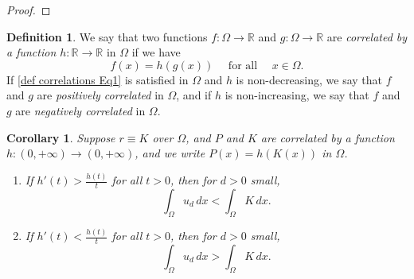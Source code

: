 \documentclass[11pt]{article}
\newcommand{\R}{\mathbb{R}}
\newcommand{\parentheses}[1]{\left(#1\right)}
\newtheorem{corollary}[statement]{Corollary}
\theoremstyle{definition}
\newtheorem{definition}[statement]{Definition}
\theoremstyle{remark}
\newtheorem{remark}[statement]{Remark}
\begin{document}
\begin{proof}
\end{proof}



\begin{definition}
    We say that two functions $f:\Omega\to\R$ and $g:\Omega\to\R$ are {\em correlated by a function $h:\R\to\R$} in $\Omega$ if we have
    \begin{equation}\label{def correlations Eq1}
        f(x)=h(g(x)) \mbox{ ~~ for  all ~~ } x\in\Omega.
    \end{equation}
    If \eqref{def correlations Eq1} is satisfied in $\Omega$ and $h$ is non-decreasing, we say that $f$ and $g$ are {\em positively correlated} in $\Omega$, and if $h$ is non-increasing, we say that $f$ and $g$ are {\em negatively correlated} in $\Omega$.
\end{definition}


    \begin{corollary} %
\label{corollary:K_equals_r} %
    Suppose $r\equiv K$ over $\Omega$, and $P$ and $K$ are correlated by a function $h:(0,+\infty)\to(0,+\infty)$, and we write $P(x)=h(K(x))$ in $\Omega$. 
    \begin{enumerate}
        \item If $h'(t)>\frac{h(t)}{t}$ for all $t>0$, then for $d>0$ small,
        \begin{equation*}
            \int_\Omega u_d\,dx<\int_\Omega K\,dx.
        \end{equation*}

        \item If $h'(t)<\frac{h(t)}{t}$ for all $t>0$, then for $d>0$ small,
        \begin{equation*}
            \int_\Omega u_d\,dx>\int_\Omega K\,dx.
        \end{equation*}
    \end{enumerate}
\end{corollary}
\end{document}
